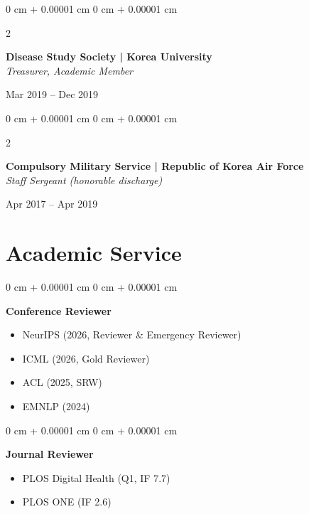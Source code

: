 \documentclass[11pt, letterpaper]{article}
\newenvironment{highlights}{
    \begin{itemize}[
        topsep=0.10 cm,
        parsep=0.10 cm,
        partopsep=0pt,
        itemsep=0pt,
        leftmargin=0 cm + 10pt
    ]
}{
    \end{itemize}
} %
\newenvironment{onecolentry}{
    \Needspace{3\baselineskip}
    \begin{adjustwidth}{
        0 cm + 0.00001 cm
    }{
        0 cm + 0.00001 cm
    }
}{
    \end{adjustwidth}
} %
\newenvironment{twocolentry}[2][]{
    \onecolentry
    \def\secondColumn{#2}
    \setcolumnwidth{\fill, 4.8 cm}
    \begin{paracol}{2}
}{
    \switchcolumn \raggedleft \secondColumn
    \end{paracol}
    \endonecolentry
} %
\begin{document}
        \begin{twocolentry}{
            Mar 2019 -- Dec 2019\\ 
        }
        \textbf{Disease Study Society | Korea University}\\
\textit{Treasurer, Academic Member}
        \end{twocolentry}
         \vspace{0.15 cm}
        \begin{twocolentry}{
            Apr 2017 -- Apr 2019\\ 
        }
        \textbf{Compulsory Military Service | Republic of Korea Air Force}\\
        \textit{Staff Sergeant (honorable discharge)}
        \end{twocolentry}
            \vspace{0.15 cm}

\section{Academic Service}

\begin{onecolentry}
    \textbf{Conference Reviewer}
    \begin{highlights}
        \item NeurIPS (2026, Reviewer \& Emergency Reviewer)
        \item ICML (2026, Gold Reviewer)
        \item ACL (2025, SRW)
        \item EMNLP (2024)
    \end{highlights}
\end{onecolentry}
\vspace{0.2 cm}

\begin{onecolentry}
    \textbf{Journal Reviewer}
    \begin{highlights}
        \item PLOS Digital Health (Q1, IF 7.7)
        \item PLOS ONE (IF 2.6)
    \end{highlights}
\end{onecolentry}
\vspace{0.15 cm}
\end{document}
